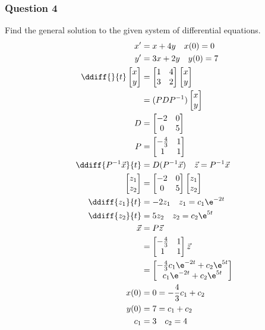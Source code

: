 \documentclass{math}
\begin{document}
\subsubsection*{Question 4}
Find the general solution to the given system of differential equations.
\begin{align*}
  x' &= x+4y \quad x(0) = 0 \\
  y' &= 3x+2y \quad y(0) = 7 \\
  \ddiff{}{t}\begin{bmatrix}x \\ y\end{bmatrix} &=
    \begin{bmatrix}1 & 4 \\ 3 & 2\end{bmatrix}
    \begin{bmatrix}x \\ y\end{bmatrix} \\
  &= (PDP^{-1})\begin{bmatrix}x \\ y\end{bmatrix} \\
  D &= \begin{bmatrix}-2 & 0 \\ 0 & 5\end{bmatrix} \\
  P &= \begin{bmatrix}-\frac{4}{3} & 1 \\ 1 & 1\end{bmatrix} \\
  \ddiff{P^{-1}\vec{x}}{t} &= D(P^{-1}\vec{x}) \quad \vec{z} = P^{-1}\vec{x} \\
  \begin{bmatrix}z_1 \\ z_2\end{bmatrix} &=
    \begin{bmatrix}-2 & 0 \\ 0 & 5\end{bmatrix}
    \begin{bmatrix}z_1 \\ z_2\end{bmatrix} \\
  \ddiff{z_1}{t} &= -2z_1 \quad z_1 = c_1\e^{-2t} \\
  \ddiff{z_2}{t} &= 5z_2 \quad z_2 = c_2\e^{5t} \\
  \vec{x} &= P\vec{z} \\
  &= \begin{bmatrix}-\frac{4}{3} & 1 \\ 1 & 1\end{bmatrix}\vec{z} \\
  &= \begin{bmatrix}
    -\frac{4}{3}c_1\e^{-2t}+c_2\e^{5t} \\
    c_1\e^{-2t}+c_2\e^{5t}
  \end{bmatrix} \\
  x(0) &= 0 = -\frac{4}{3}c_1+c_2 \\
  y(0) &= 7 = c_1+c_2 \\
  c_1 &= 3 \quad c_2 = 4
\end{align*}
\end{document}
